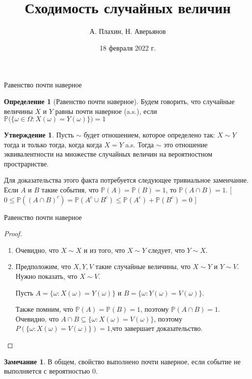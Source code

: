 \documentclass{beamer}%
\title{Сходимость случайных величин}
\author[А. Плахин, Н. Аверьянов]{А. Плахин, Н. Аверьянов}
\institute[Клуб теории вероятностей]{Клуб теории вероятностей ФЭН ВШЭ}
\date{18 февраля 2022 г.}
\theoremstyle{definition}
\newtheorem{mydef}[theorem]{Определение}
\newtheorem{proposition}[theorem]{Утверждение}
\newtheorem{remark}[theorem]{Замечание}
\renewcommand{\P}{\mathbb{P}}
\begin{document}
	
\begin{frame}
\titlepage
\end{frame}


\begin{frame}{Равенство почти наверное}

\begin{mydef}[Равенство почти наверное]

Будем говорить, что случайные величины $X$ и $Y$ равны почти наверное (a.s.), если $\P\big(\{ \omega \in \Omega: X(\omega) = Y(\omega)\}\big) = 1$

\end{mydef}


\begin{proposition}

Пусть $\sim$ будет отношением, которое определено так: $X \sim Y$  тогда и только тогда, когда когда $X = Y$ a.s. Тогда $\sim$ это отношение эквивалентности на множестве случайных величин на  вероятностном прострарнстве.

\end{proposition}

Для доказательства этого факта потребуется следующее тривиальное заменчание. Если $A$ и $B$ такие события, что $\P(A) = \P(B) = 1$, то $\P(A \cap B) = 1$. [$0 \leq \P((A \cap B)^c) = \P(A^c \cup B^c) \leq \P(A^c) + \P( B^c) = 0$ ]

\end{frame}


\begin{frame}{Равенство почти наверное}

\begin{proof}
\begin{enumerate}
    \item Очевидно, что $X \sim X$ и из того, что $X \sim Y$ следует, что $Y \sim X$.
    
    \item Предположим, что $X,Y,V$ такие случайные величины, что $X \sim Y$ и $Y \sim V$. Нужно показать, что $ X\sim V$. 
    
    Пусть $A = \{\omega: X(\omega) = Y(\omega)\}$ и $B = \{\omega: Y(\omega) = V(\omega)\}$.
    
    Также помним, что $\P(A) = \P(B) = 1$, поэтому $\P(A \cap B) = 1$. Очевидно, что $A \cap B \subseteq \{ \omega: X(\omega) = V(\omega)\}$, поэтому $P(\{\omega: X(\omega) = V(\omega)\}) = 1$,что завершает доказательство.
\end{enumerate}
\end{proof}

\begin{remark}
    В общем, свойство выполнено почти наверное, если событие не выполняется с вероятностью 0.
\end{remark}
\end{frame}
\end{document}
